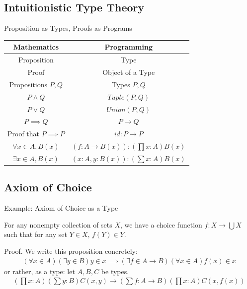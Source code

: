 \documentclass{beamer}
\theoremstyle{plain}
\begin{document}
\subsection{Intuitionistic Type Theory}
\begin{frame}{Proposition as Types, Proofs as Programs}
  \pause
  \begin{center}
  \begin{tabular}{c|c}
    Mathematics & Programming \\
    \hline
    Proposition
    \pause
                & Type\\
    \pause
    Proof
    \pause
                & Object of a Type\\
    \pause
    Propositions $P, Q$
    \pause
                & Types $P, Q$\\
    \pause
    $P\wedge Q$
    \pause
                & $Tuple(P, Q)$\\
    \pause
    $P\vee Q$
    \pause
                & $Union(P, Q)$\\
    \pause
    $P\implies Q$
    \pause
                & $P \to Q$\\
    \pause
    Proof that $P\implies P$
    \pause
                &   $id:P\to P$\\
    \pause
    $\forall x\in A, B(x)$ & $(f:A \to B(x)): (\prod x:A)B(x)$\\
    \pause
    $\exists x\in A, B(x)$ & $(x: A, y: B(x)): (\sum x:A)B(x)$\\
  \end{tabular}
  \end{center}
\end{frame}

\subsection{Axiom of Choice}
\begin{frame}{Example: Axiom of Choice as a Type}
  \begin{theorem}
    For any nonempty collection of sets $X$, we have a choice function
    $f:X\to\bigcup X$ such that for any set $Y\in X$, $f(Y)\in Y$.
  \end{theorem}

  \begin{block}{Proof.}
    We write this proposition concretely:
    \begin{align*}
    (\forall x\in A)(\exists {y\in B})y\in x\implies(\exists{f\in A\to B})(\forall{x\in A})f(x) \in x
    \end{align*}
    or rather, as a type: let $A, B, C$ be types.
    \begin{align*}
    (\prod x: A)(\sum {y: B})C(x, y)\to(\sum{f: A\to B})(\prod{x: A})C(x, f(x))
    \end{align*}
  \end{block}
\end{frame}
\end{document}
